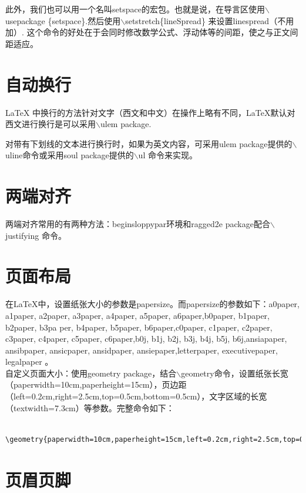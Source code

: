 \documentclass[12pt]{book}
\begin{document}
此外，我们也可以用一个名叫setspace的宏包。也就是说，在导言区使用$\backslash$usepackage \{setspace\}.然后使用$\backslash$setstretch\{lineSpread\} 来设置linespread（不用加\selectfont）. 这个命令的好处在于会同时修改数学公式、浮动体等的间距，使之与正文间距适应。

\section{自动换行}

\LaTeX{} 中换行的方法针对文字（西文和中文）在操作上略有不同，\LaTeX{}默认对西文进行换行是可以采用$\backslash$ulem package.

对带有下划线的文本进行换行时，如果为英文内容，可采用ulem package提供的$\backslash$uline命令或采用soul package提供的$\backslash$ul 命令来实现。

\section{两端对齐}

两端对齐常用的有两种方法：begin{sloppypar}环境和ragged2e package配合$\backslash$justifying 命令。

\section{页面布局}

在\LaTeX{}中，设置纸张大小的参数是papersize。而papersize的参数如下：a0paper, a1paper, a2paper, a3paper, a4paper, a5paper, a6paper,b0paper, b1paper, b2paper, b3pa per, b4paper, b5paper, b6paper,c0paper, c1paper, c2paper, c3paper, c4paper, c5paper, c6paper,b0j, b1j, b2j, b3j, b4j, b5j, b6j,ansiapaper, ansibpaper, ansicpaper, ansidpaper, ansiepaper,letterpaper, executivepaper, legalpaper 。
\\

自定义页面大小：使用geometry package，结合$\backslash$geometry命令，设置纸张长宽（paperwidth=10cm,paperheight=15cm），页边距（left=0.2cm,right=2.5cm,top=0.5cm,bottom=0.5cm），文字区域的长宽（textwidth=7.3cm）等参数。完整命令如下：

\begin{verbatim}
     \geometry{paperwidth=10cm,paperheight=15cm,left=0.2cm,right=2.5cm,top=0.5cm,bottom=0.5cm,textwidth=7.3cm,textwidth=12cm}
\end{verbatim}


\section{页眉页脚}
\end{document}
